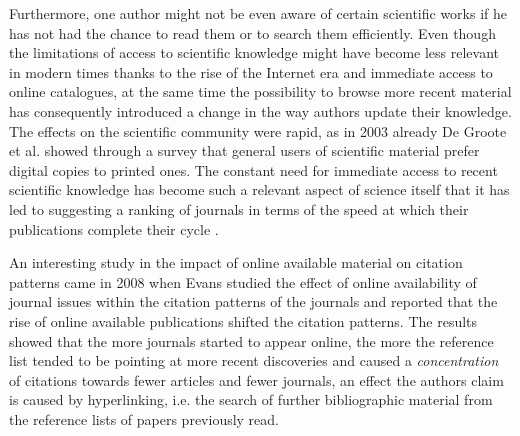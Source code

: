 Furthermore, one author might not be even aware of certain scientific works if he has not had the chance to read them or to search them
efficiently. Even though the limitations of access to scientific knowledge might have become less relevant in modern times thanks to the rise of the Internet era and immediate access to online catalogues, at the same time the possibility
to browse more recent material has consequently introduced a change in the way authors update their knowledge. The effects on the scientific community were rapid, as in 2003 already De Groote et al. \cite{pmid12883574}
showed through a survey that general users of scientific material prefer digital copies to printed ones. 
The constant need for immediate access to recent scientific knowledge has become such a relevant aspect of science itself that it has led to suggesting a ranking of journals in terms of the speed at which their publications 
complete their cycle \cite{JournalRankingSchemes}. 

An interesting study in the impact of online available material on citation patterns came in 2008 when Evans \cite{Evans395} studied the 
effect of online availability
of journal issues within the citation patterns of the journals and reported that the rise of online available publications shifted the citation patterns. The results showed that the more journals started to appear online, the more the reference list tended to be pointing at more recent discoveries and caused a \textit{concentration}
of citations towards fewer articles and fewer journals, an effect the authors claim is caused by hyperlinking, i.e. the search of further bibliographic material from the reference lists of papers previously read.


